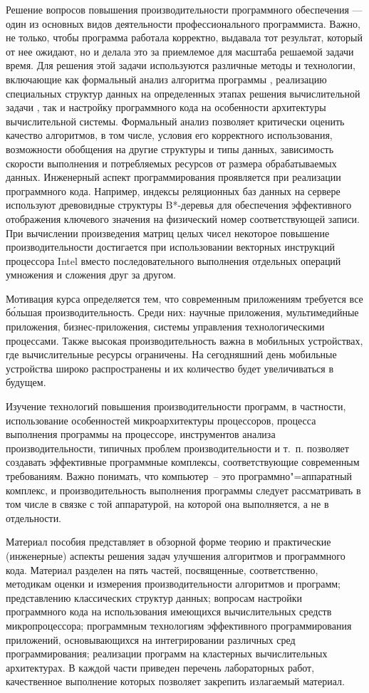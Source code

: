 \documentclass[14pt, a4paper, openany, twoside, final]{extbook} %
\begin{document}
Решение вопросов повышения производительности программного обеспечения --- один из основных видов деятельности профессионального программиста.  Важно, не только, чтобы программа работала корректно, выдавала тот результат, который от нее ожидают, но и делала это за приемлемое для масштаба решаемой задачи время.  Для решения этой задачи используются различные методы и технологии, включающие как формальный анализ алгоритма программы \cite{progproof}, реализацию специальных структур данных на определенных этапах решения вычислительной задачи \cite{algstruct}, так и настройку программного кода на особенности архитектуры вычислительной системы.  Формальный анализ позволяет критически оценить качество алгоритмов, в том числе, условия его корректного использования, возможности обобщения на другие структуры и типы данных, зависимость скорости выполнения и потребляемых ресурсов от размера обрабатываемых данных.  Инженерный аспект программирования проявляется при реализации программного кода.  Например, индексы реляционных баз данных на сервере используют древовидные структуры B*-деревья для обеспечения эффективного отображения ключевого значения на физический номер соответствующей записи.  При вычислении произведения матриц целых чисел некоторое повышение производительности достигается при использовании векторных инструкций процессора Intel вместо последовательного выполнения отдельных операций умножения и сложения друг за другом.

Мотивация курса определяется тем, что современным приложениям требуется все б\'ольшая производительность. Среди них: научные приложения, мультимедийные приложения, бизнес-приложения, системы управления технологическими процессами. Также высокая производительность важна в мобильных устройствах, где вычислительные ресурсы ограничены. На сегодняшний день мобильные устройства широко распространены и их количество будет увеличиваться в будущем.

Изучение технологий повышения производительности программ, в частности, использование особенностей микроархитектуры процессоров, процесса выполнения программы на процессоре, инструментов анализа производительности, типичных проблем производительности и т.~п. позволяет создавать эффективные программные комплексы, соответствующие современным требованиям.  Важно понимать, что компьютер~-- это программно"=аппаратный комплекс, и производительность выполнения программы следует рассматривать в том числе в связке с той аппаратурой, на которой она выполняется, а не в отдельности.

Материал пособия представляет в обзорной форме теорию и практические (инженерные) аспекты решения задач улучшения алгоритмов и программного кода.  Материал разделен на пять частей, посвященные, соответственно, методикам оценки и измерения производительности алгоритмов и программ; представлению классических структур данных; вопросам настройки программного кода на использования имеющихся вычислительных средств микропроцессора; программным технологиям эффективного программирования приложений, основывающихся на интегрировании различных сред программирования; реализации программ на кластерных вычислительных архитектурах.  В каждой части приведен перечень лабораторных работ, качественное выполнение которых позволяет закрепить излагаемый материал.
\end{document}
